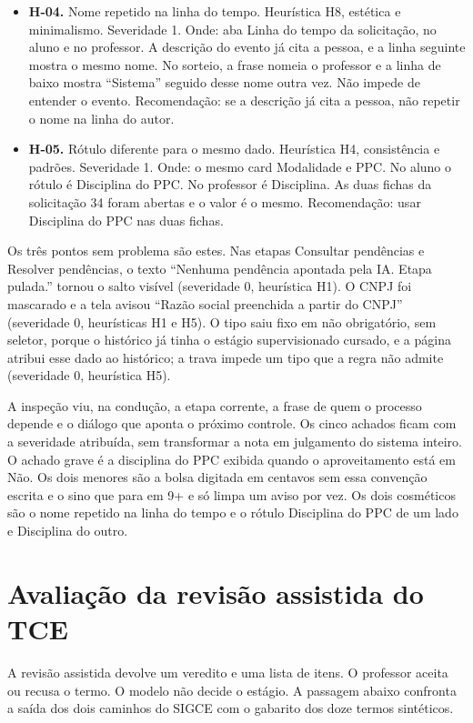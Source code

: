 \begin{itemize}
    \item \textbf{H-04.} Nome repetido na linha do tempo. Heurística H8, estética e minimalismo. Severidade 1. Onde: aba Linha do tempo da solicitação, no aluno e no professor. A descrição do evento já cita a pessoa, e a linha seguinte mostra o mesmo nome. No sorteio, a frase nomeia o professor e a linha de baixo mostra ``Sistema'' seguido desse nome outra vez. Não impede de entender o evento. Recomendação: se a descrição já cita a pessoa, não repetir o nome na linha do autor.
    \item \textbf{H-05.} Rótulo diferente para o mesmo dado. Heurística H4, consistência e padrões. Severidade 1. Onde: o mesmo card Modalidade e PPC. No aluno o rótulo é Disciplina do PPC. No professor é Disciplina. As duas fichas da solicitação 34 foram abertas e o valor é o mesmo. Recomendação: usar Disciplina do PPC nas duas fichas.
\end{itemize}

Os três pontos sem problema são estes. Nas etapas Consultar pendências e Resolver pendências, o texto ``Nenhuma pendência apontada pela IA. Etapa pulada.'' tornou o salto visível (severidade 0, heurística H1). O CNPJ foi mascarado e a tela avisou ``Razão social preenchida a partir do CNPJ'' (severidade 0, heurísticas H1 e H5). O tipo saiu fixo em não obrigatório, sem seletor, porque o histórico já tinha o estágio supervisionado cursado, e a página atribui esse dado ao histórico; a trava impede um tipo que a regra não admite (severidade 0, heurística H5).

A inspeção viu, na condução, a etapa corrente, a frase de quem o processo depende e o diálogo que aponta o próximo controle. Os cinco achados ficam com a severidade atribuída, sem transformar a nota em julgamento do sistema inteiro. O achado grave é a disciplina do PPC exibida quando o aproveitamento está em Não. Os dois menores são a bolsa digitada em centavos sem essa convenção escrita e o sino que para em 9+ e só limpa um aviso por vez. Os dois cosméticos são o nome repetido na linha do tempo e o rótulo Disciplina do PPC de um lado e Disciplina do outro.

\section{Avaliação da revisão assistida do TCE}

A revisão assistida devolve um veredito e uma lista de itens. O professor aceita ou recusa o termo. O modelo não decide o estágio. A passagem abaixo confronta a saída dos dois caminhos do SIGCE com o gabarito dos doze termos sintéticos.

